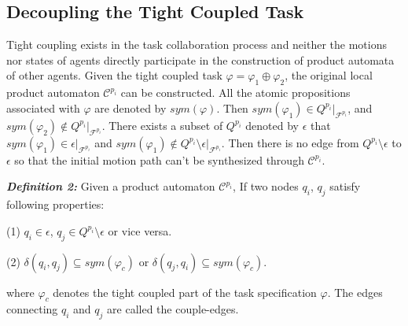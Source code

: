 \documentclass[journal]{IEEEtran}
\begin{document}
\subsection{Decoupling the Tight Coupled Task}
Tight coupling exists in the task collaboration process and neither the motions nor states of agents directly participate in the construction of product automata of other agents. Given the tight coupled task $\varphi=\varphi_1 \oplus \varphi_2$, the original local product automaton $\mathcal{C}^{p_i}$ can be constructed. All the atomic propositions associated with $\varphi$ are denoted by $sym(\varphi)$. Then $sym(\varphi_1) \in Q^{p_i}|_{\mathcal{F}^{p_i}}$, and $sym(\varphi_2) \notin Q^{p_i}|_{\mathcal{F}^{p_i}} $. There exists a subset of $Q^{p_i}$ denoted by $\epsilon$ that $sym(\varphi_1) \in \epsilon |_{\mathcal{F}^{p_i}}$ and $sym(\varphi_1) \notin Q^{p_i} \setminus \epsilon |_{\mathcal{F}^{p_i}}$. Then there is no edge from $Q^{p_i} \setminus \epsilon$ to $\epsilon$ so that the initial motion path can't be synthesized through $\mathcal{C}^{p_i}$.\par
\textbf{\emph{Definition 2:}} Given a product automaton $\mathcal{C}^{p_i}$, If two nodes $q_i$, $q_j$ satisfy following properties:
\par
(1) $q_i \in \epsilon$, $q_j \in Q^{p_i} \setminus \epsilon$ or vice versa.\par
(2) $\delta(q_i,q_j)\subseteq sym(\varphi_c)$ or $\delta(q_j,q_i)\subseteq sym(\varphi_c)$.

where $\varphi_c$ denotes the tight coupled part of the task specification $\varphi$.
The edges connecting $q_i$ and $q_j$ are called the couple-edges.
\end{document}
